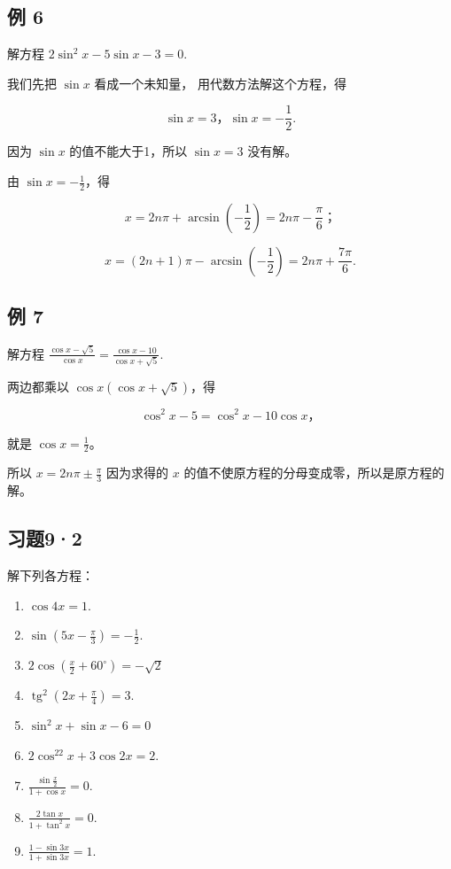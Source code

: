 \subsection{例 6}

解方程 \(2\sin^2 x - 5\sin x - 3 = 0\).

 我们先把 \(\sin x\) 看成一个未知量，
用代数方法解这个方程，得

\[
\sin x = 3\text{，} \sin x = - \frac {1}{2}.
\]

因为 \(\sin x\) 的值不能大于1，所以 \(\sin x = 3\) 没有解。

由 \(\sin x = -\frac{1}{2}\)，得

\[
x = 2 n \pi + \arcsin \left(- \frac {1}{2}\right) = 2 n \pi - \frac {\pi}{6}\text{；}
\]

\[
x = (2 n + 1) \pi - \arcsin \left(- \frac {1}{2}\right) = 2 n \pi + \frac {7 \pi}{6}.
\]

\subsection{例 7}

解方程
\(\frac{\cos x - \sqrt{5}}{\cos x} = \frac{\cos x - 10}{\cos x + \sqrt{5}}.\)

 两边都乘以 \(\cos x (\cos x + \sqrt{5})\)，得

\[
\cos^ {2} x - 5 = \cos^ {2} x - 10 \cos x\text{，}
\]

就是 \(\cos x=\frac12\)。

所以 \(x = 2n\pi \pm \frac{\pi}{3}\) 因为求得的 \(x\)
的值不使原方程的分母变成零，所以是原方程的解。

\subsection{习题9·2}

解下列各方程：

\begin{enumerate}
\item
  \(\cos 4x = 1\).
\item
  \(\sin \left(5x - \frac{\pi}{3}\right) = -\frac{1}{2}\).
\item
  \(2\cos \left(\frac{x}{2} +60^{\circ}\right) = -\sqrt{2}\)
\item
  \(\operatorname{tg}^2\left(2x + \frac{\pi}{4}\right) = 3.\)
\item
  \(\sin^2 x + \sin x - 6 = 0\)
\item
  \(2\cos^22x + 3\cos 2x = 2.\)
\item
  \(\frac{\sin\frac{x}{2}}{1 + \cos x} = 0.\)
\item
  \(\frac{2\tan x}{1 + \tan^2 x} = 0.\)
\item
  \(\frac{1 - \sin 3x}{1 + \sin 3x} = 1.\)
\end{enumerate}

